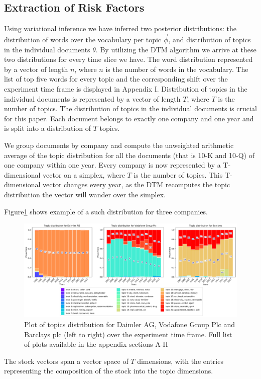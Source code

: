 \documentclass[12pt,journal,letterpaper,oneside,onecolumn]{IEEEtran}
\begin{document}
\subsection{Extraction of Risk Factors}
Using variational inference we have inferred two posterior distributions: the distribution of words over the vocabulary per topic $\vec{\phi}$, and distribution of topics in the individual documents $\theta$. By utilizing the DTM algorithm we arrive at these two distributions for every time slice we have.
The word distribution represented by a vector of length $n$, where $n$ is the number of words in the vocabulary. The list of top five words for every topic and the corresponding shift over the experiment time frame is displayed in Appendix I. 
Distribution of topics in the individual documents is represented by a vector of length $T$, where $T$ is the number of topics. The distribution of topics in the individual documents is crucial for this paper. Each document belongs to exactly one company and one year and is split into a distribution of $T$ topics.

We group documents by company and compute the unweighted arithmetic average of the topic distribution for all the documents (that is 10-K and 10-Q) of one company within one year. Every company is now represented by a T-dimensional vector on a simplex, where $T$ is the number of topics. This T-dimensional vector changes every year, as the DTM recomputes the topic distribution  the vector will wander over the simplex.

Figure\ref{fig:3-companies-topics-distribution} shows example of a such distribution for three companies.

\begin{figure}
    \centering
	\includegraphics[width=\linewidth]{images/3_companies.pdf}
	\caption{Plot of topics distribution for Daimler AG, Vodafone Group Plc and Barclays plc (left to right) over the experiment time frame. Full list of plots available in the appendix sections A-H}
	\label{fig:3-companies-topics-distribution}       
\end{figure}
The stock vectors span a vector space of $T$ dimensions, with the entries representing the composition of the stock into the topic dimensions.
\end{document}
